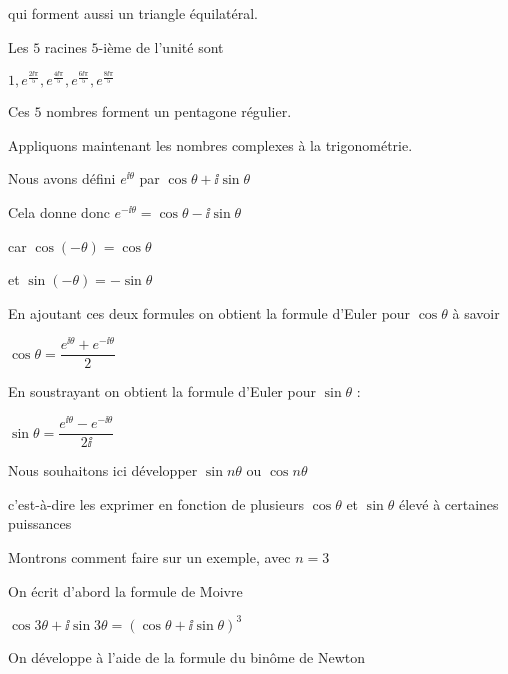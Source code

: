 \change

qui forment aussi un triangle équilatéral.

\diapo

Les $5$ racines $5$-ième de l'unité sont 

$1,e^{\frac{2\ii\pi}{5}}, e^{\frac{4\ii\pi}{5}}, e^{\frac{6\ii\pi}{5}},e^{\frac{8\ii\pi}{5}}$

\change

Ces $5$ nombres forment un pentagone régulier.


\diapo

Appliquons maintenant les nombres complexes à la trigonométrie.

Nous avons défini $e^{\ii  \theta}$ par $\cos \theta + \ii  \sin \theta$

\change

Cela donne donc $e^{-\ii  \theta} = \cos \theta - \ii  \sin \theta$

car $\cos(-\theta) = \cos\theta$

et $\sin(-\theta)= - \sin \theta$

\change

En ajoutant ces deux formules on obtient la formule d'Euler pour $\cos \theta$
à savoir

$ \cos \theta = \dfrac{e^{\ii  \theta} + e^{- \ii  \theta}}{2}$



En soustrayant on obtient la formule d'Euler pour $\sin \theta$ :

$\sin \theta = \dfrac{e^{\ii  \theta} - e^{- \ii  \theta}}{2 \ii }$

\diapo

Nous souhaitons ici développer $\sin n\theta$ ou $\cos n\theta$

c'est-à-dire les exprimer en fonction de plusieurs $\cos \theta$ et 
$\sin \theta$ élevé à certaines puissances

\change

Montrons comment faire sur un exemple, avec $n=3$

On écrit d'abord la formule de Moivre

$\cos 3 \theta + \ii  \sin 3 \theta = \left( \cos \theta + \ii  \sin \theta
  \right)^3$

\change

On développe à l'aide de la formule du binôme de Newton

